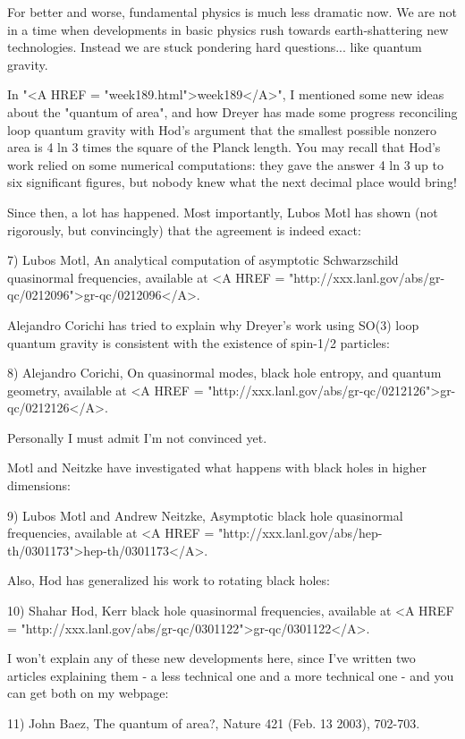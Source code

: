 For better and worse, fundamental physics is much less dramatic now.  We
are not in a time when developments in basic physics rush towards
earth-shattering new technologies.  Instead we are stuck pondering hard
questions... like quantum gravity.


In "<A HREF = "week189.html">week189</A>", I mentioned some
new ideas about the "quantum of area", and how Dreyer has made
some progress reconciling loop quantum gravity with Hod's argument that
the smallest possible nonzero area is 4 ln 3 times the square of the
Planck length.  You may recall that Hod's work relied on some numerical
computations: they gave the answer 4 ln 3 up to six significant figures,
but nobody knew what the next decimal place would bring!

Since then, a lot has happened.  Most importantly, Lubos Motl has shown
(not rigorously, but convincingly) that the agreement is indeed exact:

7) Lubos Motl, An analytical computation of asymptotic Schwarzschild
quasinormal frequencies, available at <A HREF = "http://xxx.lanl.gov/abs/gr-qc/0212096">gr-qc/0212096</A>.

Alejandro Corichi has tried to explain why Dreyer's work using SO(3)
loop quantum gravity is consistent with the existence of spin-1/2
particles:

8) Alejandro Corichi, On quasinormal modes, black hole entropy, and
quantum geometry, available at <A HREF = "http://xxx.lanl.gov/abs/gr-qc/0212126">gr-qc/0212126</A>.

Personally I must admit I'm not convinced yet.  

Motl and Neitzke have investigated what happens with black holes in
higher dimensions:

9) Lubos Motl and Andrew Neitzke, Asymptotic black hole quasinormal 
frequencies, available at <A HREF = "http://xxx.lanl.gov/abs/hep-th/0301173">hep-th/0301173</A>.

Also, Hod has generalized his work to rotating black holes:

10) Shahar Hod, Kerr black hole quasinormal frequencies, 
available at <A HREF = "http://xxx.lanl.gov/abs/gr-qc/0301122">gr-qc/0301122</A>.

I won't explain any of these new developments here, since I've written
two articles explaining them - a less technical one and a more technical
one - and you can get both on my webpage:

11) John Baez, The quantum of area?, Nature 421 (Feb. 13 2003), 702-703.
   
